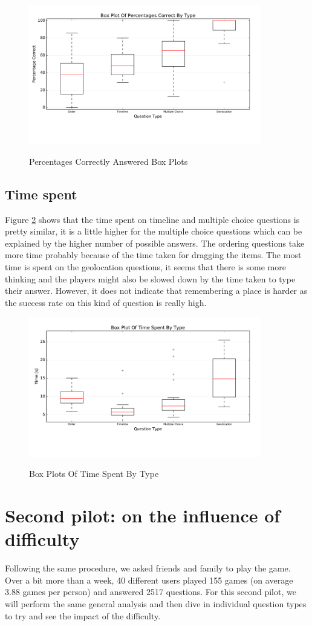 \begin{figure}
\centering
{\includegraphics[width=4in]{images/pilot_1_boxplot.pdf}}
\caption{Percentages Correctly Answered Box Plots}
\label{fig:p1Boxes}
\end{figure}

\subsection{Time spent}
Figure \ref{fig:p1BoxesTime} shows that the time spent on timeline and multiple choice questions is pretty similar, it is a little higher for the multiple choice questions which can be explained by the higher number of possible answers. The ordering questions take more time probably because of the time taken for dragging the items. The most time is spent on the geolocation questions, it seems that there is some more thinking and the players might also be slowed down by the time taken to type their answer. However, it does not indicate that remembering a place is harder as the success rate on this kind of question is really high.
\begin{figure}
\centering
{\includegraphics[width=4in]{images/pilot_1_boxplot_time.pdf}}
\caption{Box Plots Of Time Spent By Type}
\label{fig:p1BoxesTime}
\end{figure}

\section{Second pilot: on the influence of difficulty}
Following the same procedure, we asked friends and family to play the game. Over a bit more than a week, 40 different users played 155 games (on average 3.88 games per person) and answered 2517 questions. For this second pilot, we will perform the same general analysis and then dive in individual question types to try and see the impact of the difficulty.

